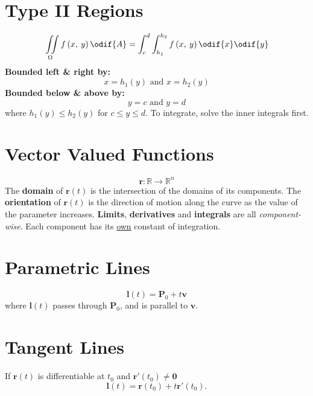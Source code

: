 \documentclass{article}
\begin{document}
\begin{multicols}{3}
    \section*{Type II Regions}
    \begin{equation*}
        \iint\limits_{\Omega} f\left( x,\: y \right) \odif{A} = \int_c^d\int_{h_1}^{h_2} f\left( x,\: y \right) \odif{x} \odif{y}
    \end{equation*}
    \textbf{Bounded left \& right by:}
    \begin{equation*}
        x=h_1\left( y \right) \text{ and } x=h_2\left( y \right)
    \end{equation*}
    \textbf{Bounded below \& above by:}
    \begin{equation*}
        y=c \text{ and } y=d
    \end{equation*}
    where \(h_1\left( y \right) \leq h_2\left( y \right)\) for
    \(c \leq y \leq d\). To integrate, solve the inner integrals first.
    \section*{Vector Valued Functions}
    \begin{equation*}
        \symbf{r}:\mathbb{R} \to \mathbb{R}^n
    \end{equation*}
    The \textbf{domain} of \(\symbf{r}\left( t \right)\) is the
    intersection of the domains of its components.
    The \textbf{orientation} of \(\symbf{r}\left( t \right)\) is the
    direction of motion along the curve as the value of the parameter
    increases. \textbf{Limits}, \textbf{derivatives} and
    \textbf{integrals} are all \textit{component-wise}. Each component
    has its \underline{own} constant of integration.
    \section*{Parametric Lines}
    \begin{equation*}
        \symbf{l}\left( t \right) = \symbf{P}_0 + t\symbf{v}
    \end{equation*}
    where \(\symbf{l}\left( t \right)\) passes through \(\symbf{P}_0\), and is parallel to \(\symbf{v}\).
    \section*{Tangent Lines}
    If \(\symbf{r}\left( t \right)\) is differentiable at
    \(t_0\) and \(\symbf{r'}\left( t_0 \right)\ne\symbf{0}\)
    \begin{equation*}
        \symbf{l}\left( t \right) = \symbf{r}\left( t_0 \right)+t\symbf{r'}\left( t_0 \right).
    \end{equation*}

\end{multicols}
\end{document}
